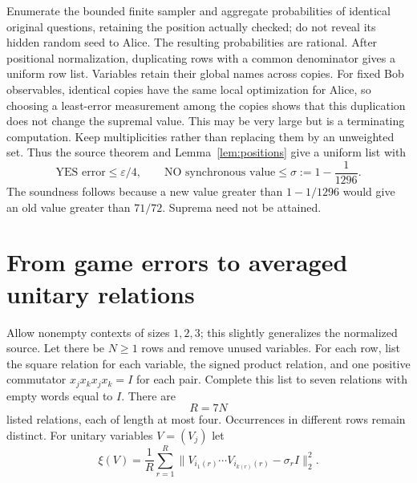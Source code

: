 \documentclass[11pt,a4paper]{article}
\newcommand{\norm}[1]{\lVert#1\rVert}
\begin{document}
Enumerate the bounded finite sampler and aggregate probabilities of identical original questions, retaining the position actually checked; do not reveal its hidden random seed to Alice. The resulting probabilities are rational. After positional normalization, duplicating rows with a common denominator gives a uniform row list. Variables retain their global names across copies. For fixed Bob observables, identical copies have the same local optimization for Alice, so choosing a least-error measurement among the copies shows that this duplication does not change the supremal value. This may be very large but is a terminating computation. Keep multiplicities rather than replacing them by an unweighted set. Thus the source theorem and Lemma~\ref{lem:positions} give a uniform list with
\begin{equation}
 \text{YES error}\le\varepsilon/4,
 \qquad
 \text{NO synchronous value}\le\sigma:=1-\frac1{1296}.
                                                               \label{eq:source}
\end{equation}
The soundness follows because a new value greater than $1-1/1296$ would give an old value greater than $71/72$. Suprema need not be attained.

\section{From game errors to averaged unitary relations}
Allow nonempty contexts of sizes $1,2,3$; this slightly generalizes the normalized source. Let there be $N\ge1$ rows and remove unused variables. For each row, list the square relation for each variable, the signed product relation, and one positive commutator $x_jx_kx_jx_k=I$ for each pair. Complete this list to seven relations with empty words equal to $I$. There are
\[
 R=7N
\]
listed relations, each of length at most four. Occurrences in different rows remain distinct. For unitary variables $V=(V_j)$ let
\[
 \xi(V)=\frac1R\sum_{r=1}^R
         \norm{V_{i_1(r)}\cdots V_{i_{k(r)}(r)}-\sigma_r I}_2^2.
\]
\end{document}
